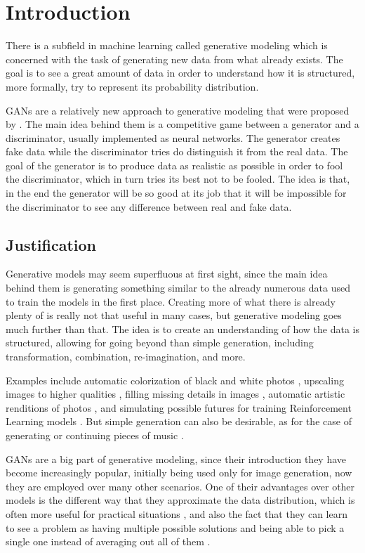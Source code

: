 \chapter{Introduction} \label{cha:introduction}
There is a subfield in machine learning called generative modeling which is concerned with the task of generating new data from what already exists. The goal is to see a great amount of data in order to understand how it is structured, more formally, try to represent its probability distribution.

\acp{GAN} are a relatively new approach to generative modeling that were proposed by \textcite{gans2014}. The main idea behind them is a competitive game between a generator and a discriminator, usually implemented as neural networks. The generator creates fake data while the discriminator tries do distinguish it from the real data. The goal of the generator is to produce data as realistic as possible in order to fool the discriminator, which in turn tries its best not to be fooled. The idea is that, in the end the generator will be so good at its job that it will be impossible for the discriminator to see any difference between real and fake data.

\section{Justification}
Generative models may seem superfluous at first sight, since the main idea behind them is generating something similar to the already numerous data used to train the models in the first place. Creating more of what there is already plenty of is really not that useful in many cases, but generative modeling goes much further than that. The idea is to create an understanding of how the data is structured, allowing for going beyond than simple generation, including transformation, combination, re-imagination, and more.

Examples include automatic colorization of black and white photos \cite{colorization_gan2018}, upscaling images to higher qualities \cite{ganSuperResolution2016}, filling missing details in images \cite{inpainting2018}, automatic artistic renditions of photos \cite{stylegan2}, and simulating possible futures for training Reinforcement Learning models \cite{nipsGAN2017}. But simple generation can also be desirable, as for the case of generating or continuing pieces of music \cite{jukebox2020}.

\acp{GAN} are a big part of generative modeling, since their introduction they have become increasingly popular, initially being used only for image generation, now they are employed over many other scenarios. One of their advantages over other models is the different way that they approximate the data distribution, which is often more useful for practical situations \cite{wasserstein2017}, and also the fact that they can learn to see a problem as having multiple possible solutions and being able to pick a single one instead of averaging out all of them \cite{nipsGAN2017}.

